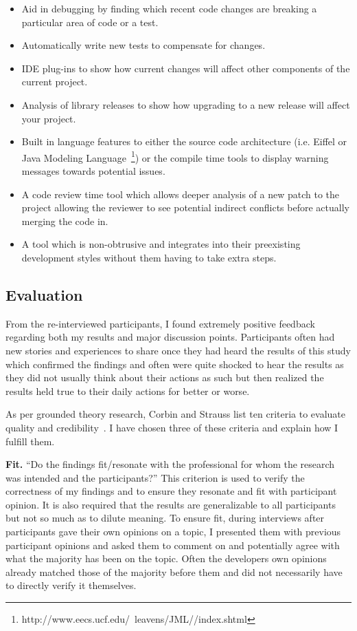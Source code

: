 \begin{itemize}
        \item Aid in debugging by finding which recent code changes are breaking a particular area of code or a test.
        \item Automatically write new tests to compensate for changes.
        \item IDE plug-ins to show how current changes will affect other components of the current project.
        \item Analysis of library releases to show how upgrading to a new release will affect your project.
        \item Built in language features to either the source code architecture (i.e. Eiffel or 
                                Java Modeling Language~\footnote{http://www.eecs.ucf.edu/~leavens/JML//index.shtml}) or the compile 
                                time tools to display warning messages towards potential issues.
        \item A code review time tool which allows deeper analysis of a new patch to the project allowing the reviewer to see potential 
                                indirect conflicts before actually merging the code in.
        \item A tool which is non-obtrusive and integrates into their preexisting development styles without them having to take extra steps.
\end{itemize}

\subsection{Evaluation}
\label{sec:exp-eval}

From the re-interviewed participants, I found extremely positive feedback regarding both my results and major discussion
points. Participants often had new stories and experiences to share once they had heard the results of this study which
confirmed the findings and often were quite shocked to hear the results as they did not usually think about their actions
as such but then realized the results held true to their daily actions for better or worse.

As per grounded theory research, Corbin and Strauss list ten criteria to evaluate quality and credibility~\cite{Corbin:1998:SP}.
I have chosen three of these criteria and explain how I fulfill them.

{\bfseries Fit.} ``Do the findings fit/resonate with the professional for whom the research was intended and the participants?'' This
criterion is used to verify the correctness of my findings and to ensure they resonate and fit with participant opinion. It is also
required that the results are generalizable to all participants but not so much as to dilute meaning. To ensure fit, during interviews
after participants gave their own opinions on a topic, I presented them with previous participant opinions and asked them to comment
on and potentially agree with what the majority has been on the topic. Often the developers own opinions already matched those of
the majority before them and did not necessarily have to directly verify it themselves.

